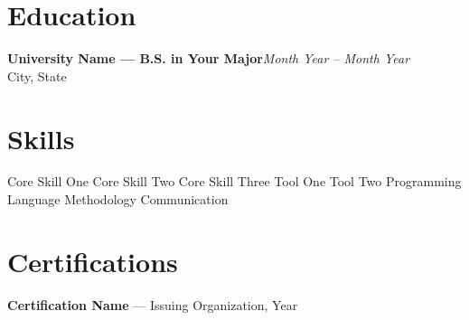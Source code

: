 \documentclass[11pt, letterpaper]{article}
\newcommand{\entry}[3]{%
    {\bfseries #1}\hfill{\itshape #2}\\
    #3\par\vspace{1pt}
}
\begin{document}
\section{Education}
\entry{University Name --- B.S. in Your Major}{Month Year -- Month Year}{City, State}

\section{Skills}
Core Skill One \textbullet{} Core Skill Two \textbullet{} Core Skill Three \textbullet{} Tool One \textbullet{} Tool Two \textbullet{} Programming Language \textbullet{} Methodology \textbullet{} Communication

\section{Certifications}
{\bfseries Certification Name} --- Issuing Organization, Year
\end{document}
